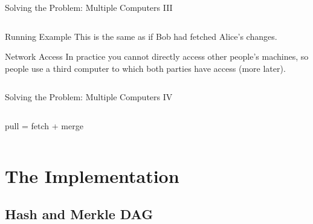 \documentclass[xetex, handout]{beamer}
\begin{document}
\begin{frame}[fragile]{Solving the Problem: Multiple Computers III}
\begin{columns}
\begin{column}{.4\linewidth}
      \begin{exampleblock}{Running Example}
        This is the same as if Bob had fetched Alice's changes.
      \end{exampleblock}

      \begin{alertblock}{Network Access}
        \footnotesize
        In practice you cannot directly access other people's machines, so
        people use a third computer to which both parties have access (more
        later).
      \end{alertblock}
    \end{column}
  \end{columns}
\end{frame}

\begin{frame}[fragile]{Solving the Problem: Multiple Computers IV}
  \begin{columns}
    \begin{column}{.6\linewidth}
      pull = fetch + merge
    \end{column}
  \end{columns}
\end{frame}

\section{The Implementation}

\subsection{Hash and Merkle DAG}
\end{document}
